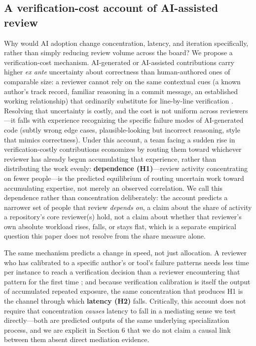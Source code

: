 \documentclass[12pt]{article}
\begin{document}
\subsection{A verification-cost account of AI-assisted review}

Why would AI adoption change concentration, latency, and iteration
specifically, rather than simply reducing review volume across the
board? We propose a verification-cost mechanism. AI-generated or
AI-assisted contributions carry higher \emph{ex ante} uncertainty about
correctness than human-authored ones of comparable size: a reviewer
cannot rely on the same contextual cues (a known author's track record,
familiar reasoning in a commit message, an established working
relationship) that ordinarily substitute for line-by-line verification
\cite{bird2023taking}. Resolving that uncertainty is costly, and the cost
is not uniform across reviewers---it falls with experience recognizing
the specific failure modes of AI-generated code (subtly wrong edge cases,
plausible-looking but incorrect reasoning, style that mimics correctness).
Under this account, a team facing a sudden rise in verification-costly
contributions economizes by routing them toward whichever reviewer has
already begun accumulating that experience, rather than distributing the
work evenly: \textbf{dependence (H1)}---review activity concentrating on
fewer people---is the predicted equilibrium of routing uncertain work
toward accumulating expertise, not merely an observed correlation. We
call this dependence rather than concentration deliberately: the account
predicts a narrower set of people that review \emph{depends on}, a claim
about the share of activity a repository's core reviewer(s) hold, not a
claim about whether that reviewer's own absolute workload rises, falls,
or stays flat, which is a separate empirical question this paper does
not resolve from the share measure alone.

The same mechanism predicts a change in speed, not just allocation. A
reviewer who has calibrated to a specific author's or tool's failure
patterns needs less time per instance to reach a verification decision
than a reviewer encountering that pattern for the first time
\cite{ziegler2022productivity}; and because verification calibration is
itself the output of accumulated repeated exposure, the same
concentration that produces H1 is the channel through which
\textbf{latency (H2)} falls. Critically, this account does not require
that concentration \emph{causes} latency to fall in a mediating sense we
test directly---both are predicted outputs of the same underlying
specialization process, and we are explicit in Section 6 that we do not
claim a causal link between them absent direct mediation evidence.
\end{document}
